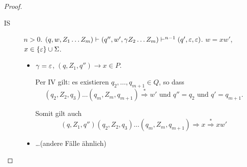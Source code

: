 \begin{proof}
\begin{itemize}
\begin{itemize}
\begin{description}
    \item[IS] $n > 0$.
      $(q, w, Z_1\ldots Z_m) \vdash (q'', w', \gamma Z_2\ldots Z_m) \vdash^{n-1} (q',\varepsilon, \varepsilon)$.
      $w =xw'$, \enspace $x \in \{\varepsilon\} \cup \Sigma$.
      \begin{itemize}
      \item $\gamma = \varepsilon$, \enspace $(q, Z_1, q'') \to x \in P$.

        Per IV gilt: es existieren $q_2,\ldots,q_{m+1} \in Q$, so dass
        \begin{displaymath}
          (q_2, Z_2, q_3)\ldots(q_m,Z_m,q_{m+1}) \stackrel{*}{\Longrightarrow} w' \text{ und } q''=q_2 \text{ und } q'=q_{m+1}.
        \end{displaymath}

        Somit gilt auch
        \begin{displaymath}
          (q, Z_1, q'') (q_2, Z_2, q_3)\ldots(q_m,Z_m,q_{m+1})\Longrightarrow x\stackrel{*}{\Longrightarrow} xw'
        \end{displaymath}
      \item \ldots (andere Fälle ähnlich)
      \end{itemize}
      \end{description}
  \end{itemize}
\end{itemize}
  

\end{proof}
